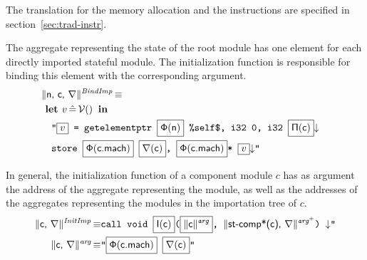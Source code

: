 \documentclass{article}
\newcommand{\trad}[2]{\ensuremath{\lVert \textsf{#1} \rVert^{\textit{#2}}}}
\newcommand{\nl}[0]{\ensuremath{\downarrow}}
\DeclareMathOperator{\isdef}{\equiv}
\DeclareMathOperator{\variable}{\mathcal{V}()}
\newcommand{\llvm}[1]{\texttt{#1}}
\newcommand{\B}[1]{\textsf{#1}}
\newcommand{\ListOf}[1]{$\mbox{#1}^+$}
\newcommand{\LET}[0]{\textbf{ let }}
\DeclareMathOperator{\BE}{\hat{=}}
\newcommand{\IN}[0]{\textbf{ in }}
\newcommand{\PH}[1]{\framebox{$#1$}}
\newcommand{\idx}[0]{\ensuremath{\sf\Pi}}
\newcommand{\stateref}[0]{\ensuremath{\sf\Phi}}
\newcommand{\self}[0]{\llvm{\%self\$}}
\newcommand{\init}[0]{\ensuremath{\mathsf{I}}}
\begin{document}
The translation for the memory allocation and the instructions are specified in
section~\ref{sec:trad-instr}.  

The aggregate representing the state of the root module has one element for
each directly imported stateful module. The initialization function is
responsible for binding this element with the corresponding argument.
\begin{align*}
  \lefteqn{\trad{\B{n}, \B{c}, \argname}{BindImp} \isdef} \\
  & \LET v \BE \variable \IN \\
  & \quad \llvm{"\PH{v} = getelementptr \PH{\stateref(\B{n})} \self, i32 0, i32 \PH{\idx(\B{c})}\nl}\\
  & \quad \llvm{store \PH{\stateref(\B{c.mach})} \PH{\argname(\B{c})}, 
    \PH{\stateref(\B{c.mach})}* \PH{v}\nl"}
\end{align*}


In general, the initialization function of a component module $c$ has as
argument the address of the aggregate representing the module, as well as the
addresses of the aggregates representing the modules in the importation tree of
$c$.
\begin{align*}
  \trad{\B{c}, \argname}{InitImp} \isdef&
  \llvm{call void \PH{\init(\B{c})}(\PH{\trad{c}{arg}}, \trad{\components(\B{c}), \argname}{\ListOf{arg}}) \nl"} \\
\trad{\B{c}, \argname}{arg} \isdef& 
  \llvm{"\PH{\stateref(\B{c.mach})} \PH{\argname(\B{c})}"}
\end{align*}





\end{document}
